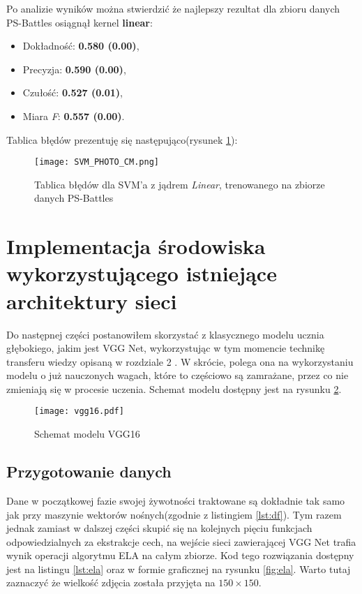 Po analizie wyników można stwierdzić że najlepszy rezultat dla zbioru danych PS-Battles osiągnął kernel \textbf{linear}:
\begin{itemize}
	\item Dokładność: \textbf{0.580 (0.00)},
	\item Precyzja: \textbf{0.590 (0.00)},
	\item Czułość: \textbf{0.527 (0.01)},
	\item Miara \textit{F}: \textbf{0.557 (0.00)}. \\
\end{itemize}
Tablica błędów prezentuję się następująco(rysunek \ref{fig:linear_cm_casia}):

\begin{figure}[h!]
	\texttt{[image: SVM\_PHOTO\_CM.png]}
	\centering
	\caption{Tablica błędów dla SVM'a z jądrem \textit{Linear}, trenowanego na zbiorze danych PS-Battles}
	\label{fig:linear_cm_casia}
\end{figure}

\section{Implementacja środowiska wykorzystującego istniejące architektury sieci}

Do następnej części postanowiłem skorzystać z klasycznego modelu ucznia głębokiego, jakim jest VGG Net, wykorzystując w tym momencie technikę transferu wiedzy opisaną w rozdziale 2 . W skrócie, polega ona na wykorzystaniu modelu o już nauczonych wagach, które to częściowo są zamrażane, przez co nie zmieniają się w procesie uczenia. Schemat modelu dostępny jest na rysunku \ref{fig:vgg16}.

\begin{figure}[h!]
	\texttt{[image: vgg16.pdf]}
	\centering
	\caption{Schemat modelu VGG16}
	\label{fig:vgg16}
\end{figure}

\subsection{Przygotowanie danych}

Dane w początkowej fazie swojej żywotności traktowane są dokładnie tak samo jak przy maszynie wektorów nośnych(zgodnie z listingiem \ref{lst:df}). Tym razem jednak zamiast w dalszej części skupić się na kolejnych pięciu funkcjach odpowiedzialnych za ekstrakcje cech, na wejście sieci zawierającej VGG Net trafia wynik operacji algorytmu ELA na całym zbiorze. Kod tego rozwiązania dostępny jest na listingu \ref{lst:ela} oraz w formie graficznej na rysunku \ref{fig:ela}. Warto tutaj zaznaczyć że wielkość zdjęcia została przyjęta na $150 \times 150$.

